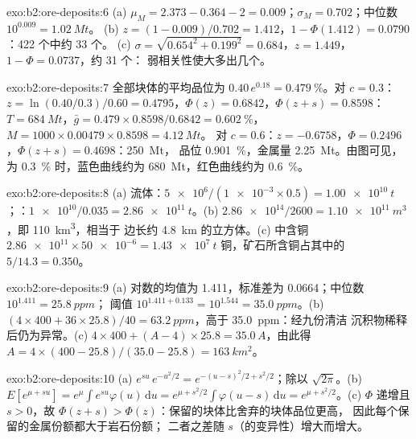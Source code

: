 \begin{solution}{exo:b2:ore-deposits:6}
(a) $\mu_M = 2.373 - 0.364 - 2 = 0.009$；$\sigma_M = 0.702$；中位数 $10^{0.009} = \qty{1.02}{Mt}$。
(b) $z = (1 - 0.009)/0.702 = 1.412$，$1 - \Phi(1.412) = 0.0790$：422 个中约 33 个。
(c) $\sigma = \sqrt{0.654^2 + 0.199^2} = 0.684$，$z = 1.449$，$1 - \Phi = 0.0737$，约 31 个：
弱相关性使大多出几个。
\end{solution}

\begin{solution}{exo:b2:ore-deposits:7}
全部块体的平均品位为 $0.40\,e^{0.18} = \qty{0.479}{\percent}$。对 $c = 0.3$：$z = \ln(0.40/0.3)/0.60 =
0.4795$，$\Phi(z) = 0.6842$，$\Phi(z + s) = 0.8598$：$T = \qty{684}{Mt}$，$\bar g = 0.479 \times
0.8598/0.6842 = \qty{0.602}{\percent}$，$M = 1000 \times 0.00479 \times 0.8598 = \qty{4.12}{Mt}$。
对 $c = 0.6$：$z = -0.6758$，$\Phi = 0.2496$，$\Phi(z + s) = 0.4698$：\qty{250}{Mt}，
品位 \qty{0.901}{\percent}，金属量 \qty{2.25}{Mt}。由图可见，为 \qty{0.3}{\percent} 时，蓝色曲线约为
\qty{680}{Mt}，红色曲线约为 \qty{0.6}{\percent}。
\end{solution}

\begin{solution}{exo:b2:ore-deposits:8}
(a) 流体：$\num{5e6}/(\num{1e-3} \times 0.5) = \qty{1.00e10}{t}$；：$\num{1e10}/0.035 =
\qty{2.86e11}{t}$。(b) $\num{2.86e14}/2600 = \qty{1.10e11}{m^3}$，即 \qty{110}{km^3}，相当于
边长约 \qty{4.8}{km} 的立方体。(c) 中含铜 $\num{2.86e11}
\times \num{50e-6} = \qty{1.43e7}{t}$ 铜，矿石所含铜占其中的 $5/14.3 = 0.350$。
\end{solution}

\begin{solution}{exo:b2:ore-deposits:9}
(a) 对数的均值为 1.411，标准差为 0.0664；中位数 $10^{1.411} = \qty{25.8}{ppm}$；
阈值 $10^{1.411 + 0.133} = 10^{1.544} = \qty{35.0}{ppm}$。(b) $(4 \times 400 + 36 \times 25.8)/40 =
\qty{63.2}{ppm}$，高于 \qty{35.0}{ppm}：经九份清洁
沉积物稀释后仍为异常。(c) $4 \times 400 + (A - 4) \times 25.8 = 35.0\,A$，由此得 $A = 4 \times (400 -
25.8)/(35.0 - 25.8) = \qty{163}{km^2}$。
\end{solution}

\begin{solution}{exo:b2:ore-deposits:10}
(a) $e^{su}\,e^{-u^2/2} = e^{-(u - s)^2/2 + s^2/2}$；除以 $\sqrt{2\pi}$。(b) $E[e^{\mu + su}] =
e^{\mu}\int e^{su}\varphi(u)\,\mathrm{d}u = e^{\mu + s^2/2}\int\varphi(u - s)\,\mathrm{d}u = e^{\mu +
s^2/2}$。(c) $\Phi$ 递增且 $s > 0$，故 $\Phi(z + s) > \Phi(z)$：保留的块体比舍弃的块体品位更高，
因此每个保留的金属份额都大于岩石份额；
二者之差随 $s$（的变异性）增大而增大。
\end{solution}

